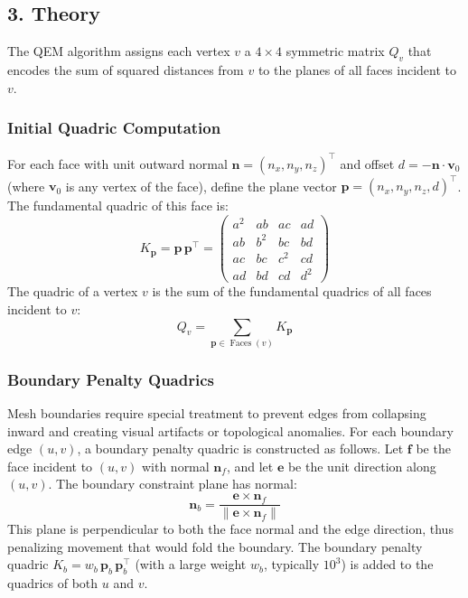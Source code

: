\subsection{3. Theory}

The QEM algorithm assigns each vertex $v$ a $4 \times 4$ symmetric matrix $Q_v$ that encodes the sum of squared distances from $v$ to the planes of all faces incident to $v$.

\subsubsection{Initial Quadric Computation}

For each face with unit outward normal $\mathbf{n} = (n_x, n_y, n_z)^\top$ and offset $d = -\mathbf{n} \cdot \mathbf{v}_0$ (where $\mathbf{v}_0$ is any vertex of the face), define the plane vector $\mathbf{p} = (n_x, n_y, n_z, d)^\top$. The fundamental quadric of this face is:
\[
    K_\mathbf{p} = \mathbf{p} \, \mathbf{p}^\top = \begin{pmatrix} a^2 & ab & ac & ad \\ ab & b^2 & bc & bd \\ ac & bc & c^2 & cd \\ ad & bd & cd & d^2 \end{pmatrix}
\]
The quadric of a vertex $v$ is the sum of the fundamental quadrics of all faces incident to $v$:
\[
    Q_v = \sum_{\mathbf{p} \in \operatorname{Faces}(v)} K_\mathbf{p}
\]

\subsubsection{Boundary Penalty Quadrics}

Mesh boundaries require special treatment to prevent edges from collapsing inward and creating visual artifacts or topological anomalies. For each boundary edge $(u, v)$, a boundary penalty quadric is constructed as follows. Let $\mathbf{f}$ be the face incident to $(u, v)$ with normal $\mathbf{n}_f$, and let $\mathbf{e}$ be the unit direction along $(u, v)$. The boundary constraint plane has normal:
\[
    \mathbf{n}_b = \frac{\mathbf{e} \times \mathbf{n}_f}{\|\mathbf{e} \times \mathbf{n}_f\|}
\]
This plane is perpendicular to both the face normal and the edge direction, thus penalizing movement that would fold the boundary. The boundary penalty quadric $K_b = w_b \, \mathbf{p}_b \, \mathbf{p}_b^\top$ (with a large weight $w_b$, typically $10^3$) is added to the quadrics of both $u$ and $v$.

